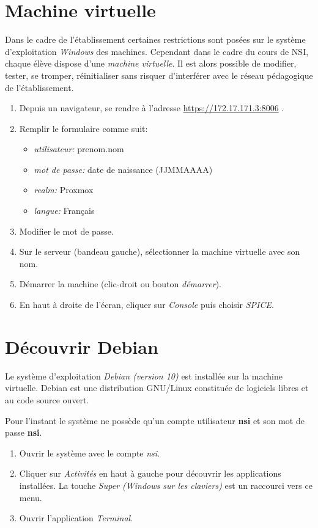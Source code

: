 \documentclass[a4paper,11pt]{article}
\begin{document}
\section{Machine virtuelle}
Dans le cadre de l'établissement certaines restrictions sont posées sur le système d'exploitation \emph{Windows} des machines. Cependant dans le cadre du cours de NSI, chaque élève dispose d'une \emph{machine virtuelle}. Il est alors possible de modifier, tester, se tromper, réinitialiser sans risquer d'interférer avec le réseau pédagogique de l'établissement.
\begin{activite}
    \begin{enumerate}
        \item Depuis un navigateur, se rendre à l'adresse \url{https://172.17.171.3:8006} .
        \item Remplir le formulaire comme suit:
              \begin{itemize}
                  \item \emph{utilisateur:} prenom.nom
                  \item \emph{mot de passe:} date de naissance (JJMMAAAA)
                  \item \emph{realm:} Proxmox
                  \item \emph{langue:} Français
              \end{itemize}
        \item Modifier le mot de passe.
        \item Sur le serveur (bandeau gauche), sélectionner la machine virtuelle avec son nom.
        \item Démarrer la machine (clic-droit ou bouton \emph{démarrer}).
        \item En haut à droite de l'écran, cliquer sur \emph{Console} puis choisir \emph{SPICE}.
    \end{enumerate}
\end{activite}
\section{Découvrir Debian}
Le système d'exploitation \emph{Debian (version 10)} est installée sur la machine virtuelle. Debian est une distribution GNU/Linux constituée de logiciels libres et au code source ouvert.

Pour l'instant le système ne possède qu'un compte utilisateur \textbf{nsi} et son mot de passe \textbf{nsi}.
\begin{activite}
    \begin{enumerate}
        \item Ouvrir le système avec le compte \emph{nsi}.
        \item Cliquer sur \emph{Activités} en haut à gauche pour découvrir les applications installées. La touche \emph{Super (Windows sur les claviers)} est un raccourci vers ce menu.
        \item Ouvrir l'application \emph{Terminal}.
    \end{enumerate}
\end{activite}
\end{document}
